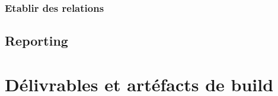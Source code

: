 \documentclass{report}
\begin{document}
          \subsubsection{Etablir des relations}

        \subsection{Reporting}

      \section{Délivrables et artéfacts de build}

  \listoffigures                  %
\end{document}
